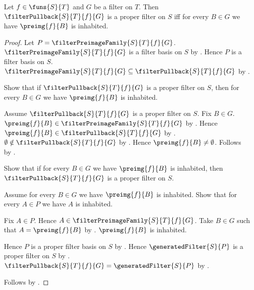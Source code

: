 \begin{theorem}\label{filter_pullback_is_proper_iff_preimages_inhabited}
    Let $f\in\funs{S}{T}$ and $G$ be a filter on $T$.
    Then $\filterPullback{S}{T}{f}{G}$ is a proper filter on $S$ iff
        for every $B\in G$ we have $\preimg{f}{B}$ is inhabited.
\end{theorem}
\begin{proof}
    Let $P=\filterPreimageFamily{S}{T}{f}{G}$.
    $\filterPreimageFamily{S}{T}{f}{G}$ is a filter basis on $S$ by
        .
    Hence $P$ is a filter basis on $S$.
    $\filterPreimageFamily{S}{T}{f}{G}
        \subseteq\filterPullback{S}{T}{f}{G}$ by
        .

    Show that if $\filterPullback{S}{T}{f}{G}$ is a proper filter on $S$,
        then for every $B\in G$ we have $\preimg{f}{B}$ is inhabited.
    \begin{subproof}
        Assume $\filterPullback{S}{T}{f}{G}$ is a proper filter on $S$.
        Fix $B\in G$.
        $\preimg{f}{B}\in\filterPreimageFamily{S}{T}{f}{G}$ by
            .
        Hence $\preimg{f}{B}\in\filterPullback{S}{T}{f}{G}$ by
            .
        $\emptyset\notin\filterPullback{S}{T}{f}{G}$ by
            .
        Hence $\preimg{f}{B}\neq\emptyset$.
        Follows by .
    \end{subproof}

    Show that if for every $B\in G$ we have $\preimg{f}{B}$ is inhabited,
        then $\filterPullback{S}{T}{f}{G}$ is a proper filter on $S$.
    \begin{subproof}
        Assume for every $B\in G$ we have $\preimg{f}{B}$ is inhabited.
        Show that for every $A\in P$ we have $A$ is inhabited.
        \begin{subproof}
            Fix $A\in P$.
            Hence $A\in\filterPreimageFamily{S}{T}{f}{G}$.
            Take $B\in G$ such that $A=\preimg{f}{B}$ by
                .
            $\preimg{f}{B}$ is inhabited.
        \end{subproof}
        Hence $P$ is a proper filter basis on $S$ by
            .
        Hence $\generatedFilter{S}{P}$ is a proper filter on $S$ by
            .
        $\filterPullback{S}{T}{f}{G}=\generatedFilter{S}{P}$ by
            .
    \end{subproof}
    Follows by \auto.
\end{proof}

